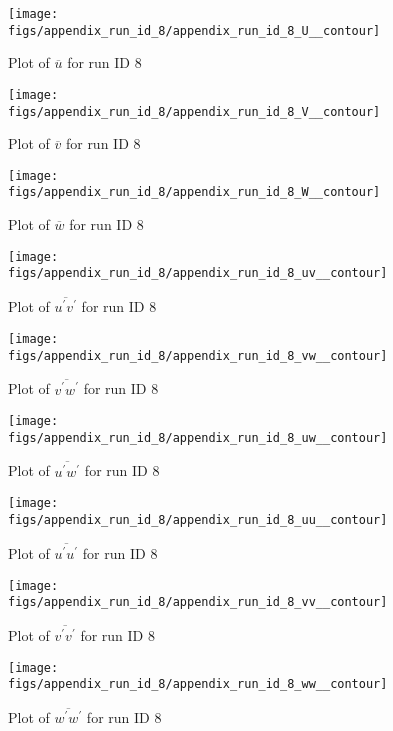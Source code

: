 \begin{figure}[H]
\centering
\texttt{[image: figs/appendix\_run\_id\_8/appendix\_run\_id\_8\_U\_\_contour]}
\caption{Plot of $\overline{u}$ for run ID 8}
\label{fig:appendix_run_id_8_U__contour}
\end{figure}


\begin{figure}[H]
\centering
\texttt{[image: figs/appendix\_run\_id\_8/appendix\_run\_id\_8\_V\_\_contour]}
\caption{Plot of $\overline{v}$ for run ID 8}
\label{fig:appendix_run_id_8_V__contour}
\end{figure}


\begin{figure}[H]
\centering
\texttt{[image: figs/appendix\_run\_id\_8/appendix\_run\_id\_8\_W\_\_contour]}
\caption{Plot of $\overline{w}$ for run ID 8}
\label{fig:appendix_run_id_8_W__contour}
\end{figure}


\begin{figure}[H]
\centering
\texttt{[image: figs/appendix\_run\_id\_8/appendix\_run\_id\_8\_uv\_\_contour]}
\caption{Plot of $\overline{u^\prime v^\prime}$ for run ID 8}
\label{fig:appendix_run_id_8_uv__contour}
\end{figure}


\begin{figure}[H]
\centering
\texttt{[image: figs/appendix\_run\_id\_8/appendix\_run\_id\_8\_vw\_\_contour]}
\caption{Plot of $\overline{v^\prime w^\prime}$ for run ID 8}
\label{fig:appendix_run_id_8_vw__contour}
\end{figure}


\begin{figure}[H]
\centering
\texttt{[image: figs/appendix\_run\_id\_8/appendix\_run\_id\_8\_uw\_\_contour]}
\caption{Plot of $\overline{u^\prime w^\prime}$ for run ID 8}
\label{fig:appendix_run_id_8_uw__contour}
\end{figure}


\begin{figure}[H]
\centering
\texttt{[image: figs/appendix\_run\_id\_8/appendix\_run\_id\_8\_uu\_\_contour]}
\caption{Plot of $\overline{u^\prime u^\prime}$ for run ID 8}
\label{fig:appendix_run_id_8_uu__contour}
\end{figure}


\begin{figure}[H]
\centering
\texttt{[image: figs/appendix\_run\_id\_8/appendix\_run\_id\_8\_vv\_\_contour]}
\caption{Plot of $\overline{v^\prime v^\prime}$ for run ID 8}
\label{fig:appendix_run_id_8_vv__contour}
\end{figure}


\begin{figure}[H]
\centering
\texttt{[image: figs/appendix\_run\_id\_8/appendix\_run\_id\_8\_ww\_\_contour]}
\caption{Plot of $\overline{w^\prime w^\prime}$ for run ID 8}
\label{fig:appendix_run_id_8_ww__contour}
\end{figure}



